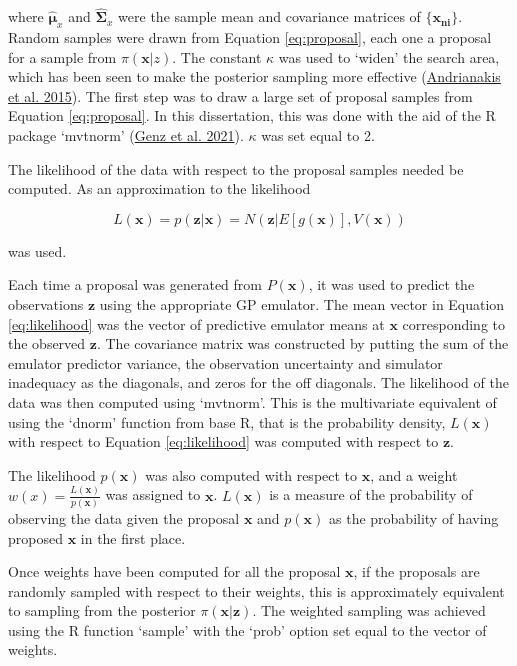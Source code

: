 \documentclass[
  12pt,
  a4paper,
  twoside]{book}
\begin{document}
where \(\hat{\mathbf{\mu}}_x\) and \(\hat{\mathbf{\Sigma}}_x\) were the sample mean and covariance matrices of \(\{\mathbf{x_{ni}}\}\). Random samples were drawn from Equation \eqref{eq:proposal}, each one a proposal for a sample from \(\pi(\mathbf{x}|z)\). The constant \(\kappa\) was used to `widen' the search area, which has been seen to make the posterior sampling more effective (\protect\hyperlink{ref-jeremy_histmatch}{Andrianakis et al. 2015}). The first step was to draw a large set of proposal samples from Equation \eqref{eq:proposal}. In this dissertation, this was done with the aid of the R package `mvtnorm' (\protect\hyperlink{ref-mvtnorm}{Genz et al. 2021}). \(\kappa\) was set equal to 2.

The likelihood of the data with respect to the proposal samples needed be computed. As an approximation to the likelihood

\begin{equation}
\label{eq:likelihood-posterior}
L(\mathbf{x}) = p\left(\mathbf{z}| \mathbf{x}\right) = N\left( \mathbf{z}| E[g(\mathbf{x})], V(\mathbf{x})\right)
\end{equation}

was used.

Each time a proposal was generated from \(P(\mathbf{x})\), it was used to predict the observations \(\mathbf{z}\) using the appropriate GP emulator. The mean vector in Equation \eqref{eq:likelihood} was the vector of predictive emulator means at \(\mathbf{x}\) corresponding to the observed \(\mathbf{z}\). The covariance matrix was constructed by putting the sum of the emulator predictor variance, the observation uncertainty and simulator inadequacy as the diagonals, and zeros for the off diagonals. The likelihood of the data was then computed using `mvtnorm'. This is the multivariate equivalent of using the `dnorm' function from base R, that is the probability density, \(L(\mathbf{x})\) with respect to Equation \eqref{eq:likelihood} was computed with respect to \(\mathbf{z}\).

The likelihood \(p(\mathbf{x})\) was also computed with respect to \(\mathbf{x}\), and a weight \(w(x) = \frac{L(\mathbf{x})}{p(\mathbf{x})}\) was assigned to \(\mathbf{x}\). \(L(\mathbf{x})\) is a measure of the probability of observing the data given the proposal \(\mathbf{x}\) and \(p(\mathbf{x})\) as the probability of having proposed \(\mathbf{x}\) in the first place.

Once weights have been computed for all the proposal \(\mathbf{x}\), if the proposals are randomly sampled with respect to their weights, this is approximately equivalent to sampling from the posterior \(\pi(\mathbf{x}|\mathbf{z})\). The weighted sampling was achieved using the R function `sample' with the `prob' option set equal to the vector of weights.
\end{document}
